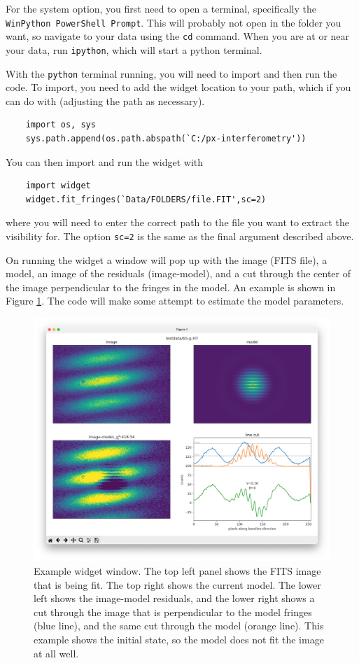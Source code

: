 \documentclass[11pt]{article}
\begin{document}
For the system option, you first need to open a terminal, specifically the \texttt{WinPython PowerShell Prompt}. This will probably not open in the folder you want, so navigate to your data using the \texttt{cd} command. When you are at or near your data, run \texttt{ipython}, which will start a python terminal.

With the \texttt{python} terminal running, you will need to import and then run the code. To import, you need to add the widget location to your path, which if you can do with (adjusting the path as necessary).
\begin{verbatim}
    import os, sys
    sys.path.append(os.path.abspath(`C:/px-interferometry'))
\end{verbatim}
You can then import and run the widget with
\begin{verbatim}
    import widget
    widget.fit_fringes(`Data/FOLDERS/file.FIT',sc=2)
\end{verbatim}
where you will need to enter the correct path to the file you want to extract the visibility for. The option \texttt{sc=2} is the same as the final argument described above.

On running the widget a window will pop up with the image (FITS file), a model, an image of the residuals (image-model), and a cut through the center of the image perpendicular to the fringes in the model. An example is shown in Figure \ref{fig:widget}. The code will make some attempt to estimate the model parameters.

\begin{figure}[h!]
    \centering
    \includegraphics[width=1\textwidth]{widget.png}
    \caption{Example widget window. The top left panel shows the FITS image that is being fit. The top right shows the current model. The lower left shows the image-model residuals, and the lower right shows a cut through the image that is perpendicular to the model fringes (blue line), and the same cut through the model (orange line). This example shows the initial state, so the model does not fit the image at all well.}
    \label{fig:widget}
\end{figure}
\end{document}
